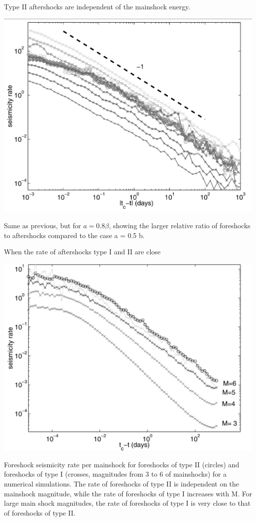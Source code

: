 \documentclass[aspectratio=43,9pt]{beamer}
\begin{document}
\begin{frame}
 {Type II aftershocks are independent of the mainshock energy.}
 
 \begin{center}
     \includegraphics[width=0.6\linewidth]{Figs/fig4} \\
 \end{center}
 Same as previous, but for $a = 0.8 \beta$, showing the larger relative ratio of foreshocks to
 aftershocks compared to the case a = 0.5 b.

 
\end{frame}



\begin{frame}
 {When the rate of aftershocks type I and II are close}
 
 \begin{center}
   \includegraphics[width=0.5\linewidth]{Figs/fig5}  
 \end{center}
   Foreshock seismicity rate per mainshock for foreshocks of type II (circles) and foreshocks of
   type I (crosses, magnitudes from 3 to 6 of mainshocks) for a numerical simulations.
   The rate of foreshocks of type II is independent on the mainshock magnitude, while 
   the rate of foreshocks of type I increases with M. For large main shock magnitudes,
   the rate of foreshocks of type I is very close to that of foreshocks of type II.


 
\end{frame}
\end{document}
